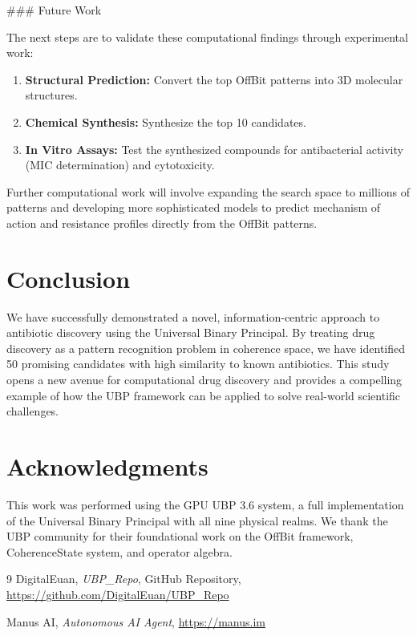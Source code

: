 \documentclass[12pt, a4paper]{article}
\begin{document}
### Future Work

The next steps are to validate these computational findings through experimental work:

\begin{enumerate}
    \item \textbf{Structural Prediction:} Convert the top OffBit patterns into 3D molecular structures.
    \item \textbf{Chemical Synthesis:} Synthesize the top 10 candidates.
    \item \textbf{In Vitro Assays:} Test the synthesized compounds for antibacterial activity (MIC determination) and cytotoxicity.
\end{enumerate}

Further computational work will involve expanding the search space to millions of patterns and developing more sophisticated models to predict mechanism of action and resistance profiles directly from the OffBit patterns.

\section{Conclusion}

We have successfully demonstrated a novel, information-centric approach to antibiotic discovery using the Universal Binary Principal. By treating drug discovery as a pattern recognition problem in coherence space, we have identified 50 promising candidates with high similarity to known antibiotics. This study opens a new avenue for computational drug discovery and provides a compelling example of how the UBP framework can be applied to solve real-world scientific challenges.

\section*{Acknowledgments}

This work was performed using the GPU UBP 3.6 system, a full implementation of the Universal Binary Principal with all nine physical realms. We thank the UBP community for their foundational work on the OffBit framework, CoherenceState system, and operator algebra.

\begin{thebibliography}{9}
DigitalEuan, \textit{UBP\_Repo}, GitHub Repository, \url{https://github.com/DigitalEuan/UBP_Repo}

Manus AI, \textit{Autonomous AI Agent}, \url{https://manus.im}

\end{thebibliography}
\end{document}

